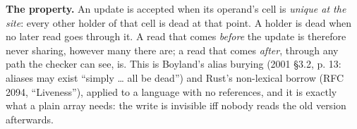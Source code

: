\textbf{The property.} An update is accepted when its operand's cell is \emph{unique at the site}: every other holder of that cell is dead at that point. A holder is dead when no later read goes through it. A read that comes \emph{before} the update is therefore never sharing, however many there are; a read that comes \emph{after}, through any path the checker can see, is. This is Boyland's alias burying (2001 §3.2, p. 13: aliases may exist “simply … all be dead”) and Rust's non-lexical borrow (RFC 2094, “Liveness”), applied to a language with no references, and it is exactly what a plain array needs: the write is invisible iff nobody reads the old version afterwards.
